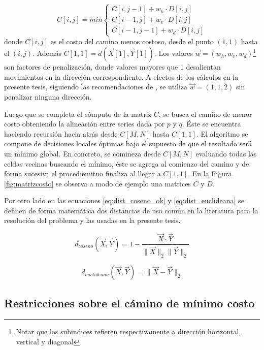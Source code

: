 \documentclass
  [ams,pdfout]%
	{aeslac}
\begin{document}
\begin{equation}
\label{eq:matrizcosto}
C[i,j] = min\left\lbrace  
\begin{array}{ll}
C[i,j-1] + w_h\cdot D[i,j]\\
C[i-1,j] + w_v\cdot D[i,j]\\
C[i-1,j-1] + w_d\cdot D[i,j]
\end{array}
\right.
\end{equation}
donde $C[i,j]$ es el costo del camino menos costoso, desde el punto $(1,1)$ hasta el $(i,j)$. Además $C[1,1]=d(\vec{X}[1],\vec{Y}[1])$. Los valores $\vec{w}=(w_h,w_v,w_d)$\footnote{Notar que los subindices refieren respectivamente a dirección horizontal, vertical y diagonal} son factores de penalización, donde valores mayores que $1$ desalientan movimientos en la dirección correspondiente. A efectos de los cálculos en la presente tesis, siguiendo las recomendaciones de \cite{sakoe1978dynamic}, se utiliza $\vec{w}=(1,1,2)$ sin penalizar ninguna dirección. 

Luego que se completa el cómputo de la matriz $C$, se busca el camino de menor costo obteniendo la alineación entre series dada por $p$ y $q$. Éste se encuentra haciendo recursión hacia atrás desde $C[M,N]$ hasta $C[1,1]$. El algoritmo se compone de decisiones locales óptimas bajo el supuesto de que el resultado será un mínimo global. En concreto, se comineza desde $C[M,N]$ evaluando todas las celdas vecinas buscando el mínimo, éste se agrega al comienzo del camino y de forma sucesiva el procediemitno finaliza al llegar a $C[1,1]$. En la Figura \ref{fig:matrizcosto} se observa a modo de ejemplo una matrices $C$ y $D$. 


Por otro lado en las ecuaciones \ref{eq:dist_coseno_ok} y \ref{eq:dist_euclideana} se definen de forma matemática dos distancias de uso común en la literatura para la resolución del problema y las usadas en la presente tesis.


\begin{equation}
\label{eq:dist_coseno_ok}
d_{coseno}(\vec{X},\vec{Y}) = 1 - \frac{\vec{X}\cdot\vec{Y}}{\lVert\vec{X}\rVert_{2}\lVert\vec{Y}\rVert_{2}}
\end{equation}

\begin{equation}
\label{eq:dist_euclideana}
d_{euclideana}(\vec{X},\vec{Y}) = \lVert \vec{X} - \vec{Y} \rVert_{2}
\end{equation}


\subsection{Restricciones sobre el cámino de mínimo costo}
\label{sec:restricciones}
\end{document}
